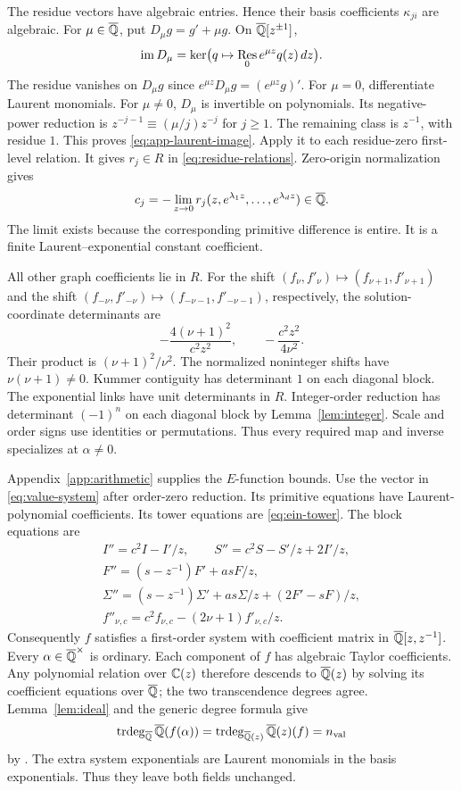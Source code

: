 The residue vectors have algebraic entries. Hence their basis
coefficients $\kappa_{ji}$ are algebraic.
For $\mu\in{\overline{\mathbb{Q}}}$, put $D_\mu g=g'+\mu g$.
On ${\overline{\mathbb{Q}}}[z^{\pm1}]$,
\begin{equation}\label{eq:app-laurent-image}
 \operatorname{im}D_\mu
 =\ker\bigl(q\mapsto\operatorname*{Res}_0 e^{\mu z}q(z)\,dz\bigr).
\end{equation}
The residue vanishes on $D_\mu g$ since
$e^{\mu z}D_\mu g=(e^{\mu z}g)'$.
For $\mu=0$, differentiate Laurent monomials.
For $\mu\ne0$, $D_\mu$ is invertible on polynomials.
Its negative-power reduction is
$z^{-j-1}\equiv(\mu/j)z^{-j}$ for $j\ge1$.
The remaining class is $z^{-1}$, with residue $1$.
This proves \eqref{eq:app-laurent-image}.
Apply it to each residue-zero first-level relation.
It gives $r_j\in R$ in \eqref{eq:residue-relations}.
Zero-origin normalization gives
\[
 c_j=-\lim_{z\to0}r_j(z,e^{\lambda_1z},\ldots,e^{\lambda_dz})
     \in{\overline{\mathbb{Q}}}.
\]
The limit exists because the corresponding primitive difference is entire.
It is a finite Laurent--exponential constant coefficient.

All other graph coefficients lie in $R$.
For the shift $(f_\nu,f'_\nu)\mapsto(f_{\nu+1},f'_{\nu+1})$ and the shift
$(f_{-\nu},f'_{-\nu})\mapsto(f_{-\nu-1},f'_{-\nu-1})$, respectively,
the solution-coordinate determinants are
\[
 -\frac{4(\nu+1)^2}{c^2z^2},\qquad
 -\frac{c^2z^2}{4\nu^2}.
\]
Their product is $(\nu+1)^2/\nu^2$.
The normalized noninteger shifts have $\nu(\nu+1)\ne0$.
Kummer contiguity has determinant $1$ on each diagonal block.
The exponential links have unit determinants in $R$.
Integer-order reduction has determinant $(-1)^n$ on each diagonal block
by Lemma~\ref{lem:integer}.
Scale and order signs use identities or permutations.
Thus every required map and inverse specializes at $\alpha\ne0$.

Appendix~\ref{app:arithmetic} supplies the $E$-function bounds.
Use the vector in \eqref{eq:value-system} after order-zero reduction.
Its primitive equations have Laurent-polynomial coefficients.
Its tower equations are \eqref{eq:ein-tower}.
The block equations are
\[
\begin{gathered}
 I''=c^2I-I'/z,\qquad
 S''=c^2S-S'/z+2I'/z,\\
 F''=(s-z^{-1})F'+asF/z,\\
 \Sigma''=(s-z^{-1})\Sigma'+as\Sigma/z+(2F'-sF)/z,\\
 f''_{\nu,c}=c^2f_{\nu,c}-(2\nu+1)f'_{\nu,c}/z.
\end{gathered}
\]
Consequently $f$ satisfies a first-order system with coefficient matrix
in ${\overline{\mathbb{Q}}}[z,z^{-1}]$.
Every $\alpha\in{\overline{\mathbb{Q}}}^\times$ is ordinary.
Each component of $f$ has algebraic Taylor coefficients. Any polynomial
relation over $\mathbb{C}(z)$ therefore descends to ${\overline{\mathbb{Q}}}(z)$ by solving its
coefficient equations over ${\overline{\mathbb{Q}}}$; the two transcendence degrees agree.
Lemma~\ref{lem:ideal} and the generic degree formula give
\begin{equation}\label{eq:app-specialized-degree}
 \operatorname{trdeg}_{{\overline{\mathbb{Q}}}}{\overline{\mathbb{Q}}}(f(\alpha))
 =\operatorname{trdeg}_{{\overline{\mathbb{Q}}}(z)}{\overline{\mathbb{Q}}}(z)(f)=n_{\mathrm{val}}
\end{equation}
by \cite[Theorem~1.1, p.~370]{Beukers2006}.
The extra system exponentials are Laurent monomials in the basis
exponentials. Thus they leave both fields unchanged.

